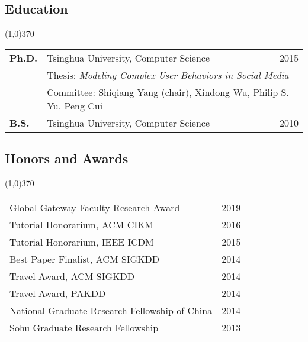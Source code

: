 \documentclass[10pt]{article}
\newcounter{list}
\begin{document}
\vspace{-0.2cm}
\subsection{\sc Education}
\vspace{-0.4cm} \line(1,0){370} \vspace{-0.1cm}

\begin{table}[h!]
\begin{tabular*}{12.7cm}{p{1.15cm}p{8.25cm}r}
\bf{Ph.D.}&Tsinghua University, Computer Science&2015\\
 &\multicolumn{2}{l}{\small Thesis: \emph{Modeling Complex User Behaviors in Social Media}}\\
 &\multicolumn{2}{l}{\small Committee: Shiqiang Yang (chair), Xindong Wu, Philip S. Yu, Peng Cui\vspace{0.2cm}}\\
\bf{B.S.}&Tsinghua University, Computer Science&2010\\

\end{tabular*}
\end{table}

\vspace{-0.6cm}
\subsection{\sc Honors and Awards}
\vspace{-0.4cm} \line(1,0){370} \vspace{-0.1cm}

\begin{table}[h!]
\begin{tabular*}{12.7cm}{p{11.65cm}r}
Global Gateway Faculty Research Award&2019 \\
Tutorial Honorarium, ACM CIKM&2016 \\
Tutorial Honorarium, IEEE ICDM&2015 \\
Best Paper Finalist, ACM SIGKDD&2014 \\
Travel Award, ACM SIGKDD&2014 \\
Travel Award, PAKDD&2014 \\
National Graduate Research Fellowship of China&2014 \\
Sohu Graduate Research Fellowship&2013 \\
\end{tabular*}
\end{table}
\end{document}
